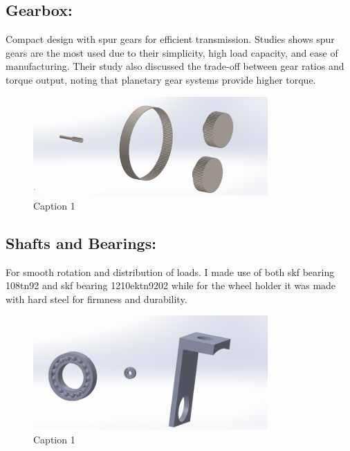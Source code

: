\documentclass[../../main]{subfiles}
\begin{document}


\subsection{Gearbox:}
Compact design with spur gears for efficient transmission.
Studies shows spur gears are the most used due to their simplicity, high
load capacity, and ease of manufacturing. Their study also discussed the
trade-off between gear ratios and torque output, noting that planetary
gear systems provide higher torque.
\begin{figure}[h]
  \centering
  \includegraphics[width=0.8\textwidth]{sublatex/Opryrmi/media/image3.png} 
  \caption{Caption 1}
\end{figure}

\subsection{Shafts and Bearings:} 
For smooth rotation and distribution of loads.
I made use of both skf bearing 108tn92 and skf bearing 1210ektn9202
while for the wheel holder it was made with hard steel for firmness and
durability.
\begin{figure}[h]
  \centering
  \includegraphics[width=0.8\textwidth]{sublatex/Opryrmi/media/image4.png} 
  \caption{Caption 1}
\end{figure}
\end{document}
